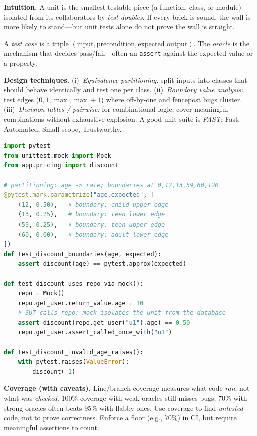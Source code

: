 \textbf{Intuition.} A unit is the smallest testable piece (a function, class, or module) isolated from its collaborators by \emph{test doubles}. If every brick is sound, the wall is more likely to stand---but unit tests alone do not prove the wall is straight.

\begin{definition}
A \emph{test case} is a triple $(\text{input}, \text{precondition}, \text{expected output})$. The \emph{oracle} is the mechanism that decides pass/fail---often an \texttt{assert} against the expected value or a property.
\end{definition}

\textbf{Design techniques.} (i)~\emph{Equivalence partitioning:} split inputs into classes that should behave identically and test one per class. (ii)~\emph{Boundary value analysis:} test edges ($0,1,\max,\max+1$) where off-by-one and fencepost bugs cluster. (iii)~\emph{Decision tables / pairwise:} for combinational logic, cover meaningful combinations without exhaustive explosion. A good unit suite is \emph{FAST}: Fast, Automated, Small scope, Trustworthy.

\begin{lstlisting}[language=Python,caption={Unit tests with partitions, boundaries, and mocking. Each test name states the scenario and expected outcome.},label={lst:unit-test}]
import pytest
from unittest.mock import Mock
from app.pricing import discount

# partitioning: age -> rate; boundaries at 0,12,13,59,60,120
@pytest.mark.parametrize("age,expected", [
    (12, 0.50),   # boundary: child upper edge
    (13, 0.25),   # boundary: teen lower edge
    (59, 0.25),   # boundary: teen upper edge
    (60, 0.00),   # boundary: adult lower edge
])
def test_discount_boundaries(age, expected):
    assert discount(age) == pytest.approx(expected)

def test_discount_uses_repo_via_mock():
    repo = Mock()
    repo.get_user.return_value.age = 10
    # SUT calls repo; mock isolates the unit from the database
    assert discount(repo.get_user("u1").age) == 0.50
    repo.get_user.assert_called_once_with("u1")

def test_discount_invalid_age_raises():
    with pytest.raises(ValueError):
        discount(-1)
\end{lstlisting}

\textbf{Coverage (with caveats).} Line/branch coverage measures what code \emph{ran}, not what was \emph{checked}. 100\% coverage with weak oracles still misses bugs; 70\% with strong oracles often beats 95\% with flabby ones. Use coverage to find \emph{untested} code, not to prove correctness. Enforce a floor (e.g., 70\%) in CI, but require meaningful assertions to count.

